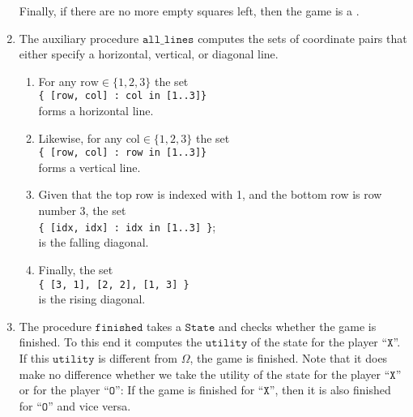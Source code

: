 \begin{enumerate}
      Finally, if there are no more empty squares left, then the game is a .
\item The auxiliary procedure $\texttt{all\_lines}$ computes the sets of coordinate pairs that 
      either specify a horizontal, vertical, or diagonal line.
      \begin{enumerate}
      \item For any $\mathrm{row} \in \{1,2,3\}$ the set 
            \\[0.2cm]
            \hspace*{1.3cm}
            \texttt{\{ [row, col] : col in [1..3]\}} 
            \\[0.2cm]
            forms a horizontal line. 
      \item Likewise, for any $\mathrm{col} \in \{1,2,3\}$ the set 
            \\[0.2cm]
            \hspace*{1.3cm}
            \texttt{\{ [row, col] : row in [1..3]\}} 
            \\[0.2cm]
            forms a vertical line. 
      \item Given that the top row is indexed with 1, and the bottom row is row number 3, the set
            \\[0.2cm]
            \hspace*{1.3cm}
            \texttt{\{ [idx, idx] : idx in [1..3] \}};
            \\[0.2cm]
            is the falling diagonal.
      \item Finally, the set
            \\[0.2cm]
            \hspace*{1.3cm}
            \texttt{\{ [3, 1], [2, 2], [1, 3] \}}
            \\[0.2cm]
            is the rising diagonal.  
      \end{enumerate}
\item The procedure $\texttt{finished}$ takes a $\texttt{State}$ and checks whether the game is finished.
      To this end it computes the $\texttt{utility}$ of the state for the player ``$\texttt{X}$''.  
      If this $\texttt{utility}$ is different from $\Omega$, the game is finished.  Note that it does make no
      difference whether we take the utility of the state for the player ``$\texttt{X}$'' or for the player
      ``$\texttt{O}$'': If the game is finished for  ``$\texttt{X}$'', then it is also finished for ``$\texttt{O}$'' and vice versa.
\end{enumerate}

